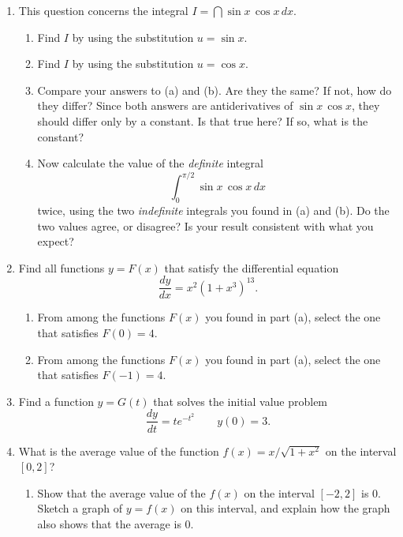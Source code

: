 \begin{enumerate}
\begin{enumerate}
\end{enumerate}
\item This question concerns the integral
$I = \dint \sin{x} \, \cos{x} \, dx$.

  \begin{enumerate}
  \item Find $I$ by using the substitution $u = \sin{x}$.

  \item Find $I$ by using the substitution $u = \cos{x}$.

  \item Compare your answers to (a) and (b).  Are they the same?  If not,
how do they differ?  Since both answers are antiderivatives of
$\sin{x} \, \cos{x}$, they should differ only by a constant.  Is that
true here? If so, what is the constant?

  \item Now calculate the value of the {\em definite\/} integral
	\[
\int_0^{\pi/2} \sin{x}\,\cos{x} \,dx
\]
twice, using the two {\em indefinite\/} integrals you found in (a) and
(b).  Do the two values agree, or disagree?  Is your result consistent
with what you expect?



\end{enumerate}
\item Find all functions $y = F(x)$ that satisfy the differential equation
	\[
\dfrac{dy}{dx} = x^2 \left( 1 + x^3 \right)^{13}.
\]


  \begin{enumerate}
  \item From among the functions $F(x)$ you found in part (a), select the
one that satisfies $F(0) = 4$.

  \item From among the functions $F(x)$ you found in part (a), select the
one that satisfies $F(-1) = 4$.



\end{enumerate}
\item Find a function $y = G(t)$ that solves the initial value problem
	\[
\dfrac{dy}{dt} = t e^{-t^2}
		\qquad y(0) = 3.
\]


\item What is the average value of the function $f(x) =
x/\sqrt{1+x^2}$ on the interval $[0, 2]$?

  \begin{enumerate}
  \item Show that the average value of the $f(x)$ on the interval $[-2,
  2]$ is 0.  Sketch a graph of $y = f(x)$ on this interval, and
explain how the graph also shows that the average is 0.



\end{enumerate}
\end{enumerate}
